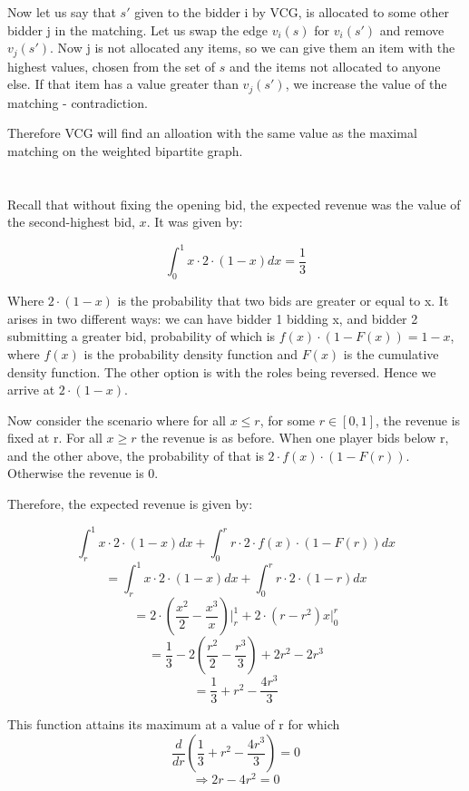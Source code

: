 \documentclass[11pt,journal]{article}
\begin{document}
	Now let us say that $s'$ given to the bidder i by VCG, is allocated to some other bidder j in the matching. Let us swap the edge $v_i(s)$ for $v_i(s')$ and remove $v_j(s')$. Now j is not allocated any items, so we can give them an item with the highest values, chosen from the set of $s$ and the items not allocated to anyone else. If that item has a value greater than $v_j(s')$, we increase the value of the matching - contradiction.
	
	Therefore VCG will find an alloation with the same value as the maximal matching on the weighted bipartite graph.
	
	\section{}	
	
	Recall that without fixing the opening bid, the expected revenue was the value of the second-highest bid, $x$. It was given by:
	
	\[\int^{1}_{0}x \cdot 2 \cdot (1-x) dx = \dfrac{1}{3}\]
	
	Where $ 2 \cdot (1-x)$ is the probability that two bids are greater or equal to x. It arises in two different ways: we can have bidder 1 bidding x, and bidder 2 submitting a greater bid, probability of which is $f(x)\cdot (1 - F(x)) = 1 - x$, where $f(x)$ is the probability density function and $F(x)$ is the cumulative density function. The other option is with the roles being reversed. Hence we arrive at $2\cdot(1-x)$.
	
	Now consider the scenario where for all $x \leq r$, for some $r \in [0,1]$, the revenue is fixed at r. For all $x \geq r$ the revenue is as before. When one player bids below r, and the other above, the probability of that is $2\cdot f(x)\cdot(1 - F(r))$. Otherwise the revenue is 0.
	
	Therefore, the expected revenue is given by:
	
	\[\int^{1}_{r}x \cdot 2 \cdot (1-x) dx + \int^{r}_{0}r\cdot 2\cdot f(x)\cdot(1 - F(r)) dx  \]
	\[=\int^{1}_{r}x \cdot 2 \cdot (1-x) dx + \int^{r}_{0}r\cdot 2\cdot (1 - r) dx  \]
	\[= 2 \cdot (\frac{x^2}{2} - \frac{x^3}{x})\Bigr| ^{1}_{r}  + 2\cdot(r - r^2)x \Bigr|_{0}^{r} \]
	\[= \frac{1}{3} - 2(\frac{r^2}{2} - \frac{r^3}{3}) + 2r^2 - 2r^3\]
	\[= \frac{1}{3} + r^2 - \frac{4r^3}{3} \]
	
	This function attains its maximum at  a value of r for which
	\[ \frac{d}{dr} ( \frac{1}{3} + r^2 - \frac{4r^3}{3}  ) = 0  \]
	\[\Rightarrow 2r - 4r^2 = 0 \]
	
\end{document}
